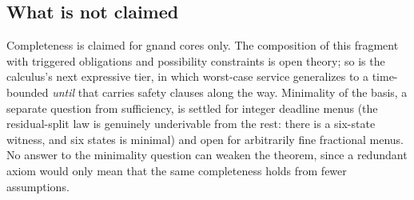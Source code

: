 \subsection{What is not claimed}
\label{sec:gnand-not-claimed}

Completeness is claimed for gnand cores only. The composition of
this fragment with triggered obligations and possibility constraints
is open theory; so is the calculus's next expressive tier, in which
worst-case service generalizes to a time-bounded \emph{until} that
carries safety clauses along the way. Minimality of the basis, a
separate question from sufficiency, is settled for integer deadline
menus (the residual-split law is genuinely underivable from the
rest: there is a six-state witness, and six states is minimal) and
open for arbitrarily fine fractional menus. No answer to the
minimality question can weaken the theorem, since a redundant axiom
would only mean that the same completeness holds from fewer
assumptions.
